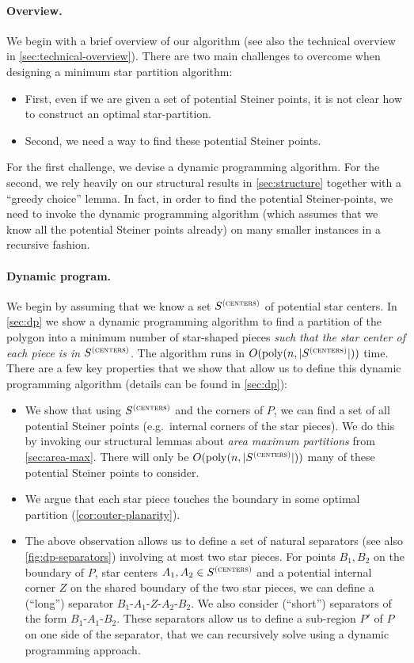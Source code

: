 \documentclass{theoretics}
\newcommand\Scen{S^{\textsc{(centers)}}}
\newcommand\poly{\mathrm{poly}}
\begin{document}
\paragraph{Overview.} We begin with a brief overview of our algorithm (see also the technical overview in \cref{sec:technical-overview}).
There are two main challenges to overcome when designing a minimum star partition algorithm:
\begin{itemize}
\item First, even if we are given a set of potential Steiner points, it is not clear how to construct an optimal star-partition. 
\item Second, we need a way to find these potential Steiner points.
\end{itemize}
For the first challenge, we devise a dynamic programming algorithm. For the second, we rely heavily on our structural results in \cref{sec:structure} together with a ``greedy choice'' lemma. In fact, in order to find the potential Steiner-points, we need to invoke the dynamic programming algorithm (which assumes that we know all the potential Steiner points already) on many smaller instances in a recursive fashion.

\paragraph{Dynamic program.}
We begin by assuming that we know a set $\Scen$ of potential star centers. In \cref{sec:dp} we show a dynamic programming algorithm to find a partition of the polygon into a minimum number of star-shaped pieces \emph{such that the star center of each piece is in $\Scen$}. The algorithm runs in $O(\poly(n,|\Scen|))$ time. 
There are a few key properties that we show that allow us to define this dynamic programming algorithm (details can be found in \cref{sec:dp}):
\begin{itemize}
\item We show that using $\Scen$ and the corners of $P$, we can find a set of all potential Steiner points (e.g.\  internal corners of the star pieces). We do this by invoking our structural lemmas about \emph{area maximum partitions} from \cref{sec:area-max}. There will only be $O(\poly(n,|\Scen|))$ many of these potential Steiner points to consider.
\item We argue that each star piece touches the boundary in some optimal partition (\cref{cor:outer-planarity}).
\item
The above observation allows us to define a set of natural separators (see also \cref{fig:dp-separators}) involving at most two star pieces.
For points $B_1,B_2$ on the boundary of $P$, star centers $A_1,A_2\in \Scen$ and a potential internal corner $Z$ on the shared boundary of the two star pieces, we can define a (``long'') separator $B_1$-$A_1$-$Z$-$A_2$-$B_2$. We also consider (``short'') separators of the form $B_1$-$A_1$-$B_2$. These separators allow us to define a sub-region $P'$ of $P$ on one side of the separator, that we can recursively solve using a dynamic programming approach.
\end{itemize}
\end{document}
